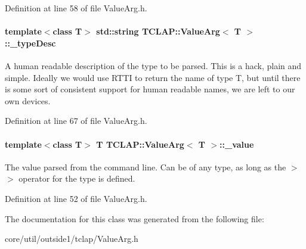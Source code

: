 Definition at line 58 of file Value\+Arg.\+h.

\paragraph[{\texorpdfstring{\+\_\+type\+Desc}{_typeDesc}}]{\setlength{\rightskip}{0pt plus 5cm}template$<$class T$>$ std\+::string {\bf T\+C\+L\+A\+P\+::\+Value\+Arg}$<$ T $>$\+::\+\_\+type\+Desc\hspace{0.3cm}{\ttfamily [protected]}}\hypertarget{classTCLAP_1_1ValueArg_a78c5e5b67ce4bcebb57c886d9aa49259}{}\label{classTCLAP_1_1ValueArg_a78c5e5b67ce4bcebb57c886d9aa49259}
A human readable description of the type to be parsed. This is a hack, plain and simple. Ideally we would use R\+T\+TI to return the name of type T, but until there is some sort of consistent support for human readable names, we are left to our own devices. 

Definition at line 67 of file Value\+Arg.\+h.

\paragraph[{\texorpdfstring{\+\_\+value}{_value}}]{\setlength{\rightskip}{0pt plus 5cm}template$<$class T$>$ T {\bf T\+C\+L\+A\+P\+::\+Value\+Arg}$<$ T $>$\+::\+\_\+value\hspace{0.3cm}{\ttfamily [protected]}}\hypertarget{classTCLAP_1_1ValueArg_a45d5fdfce5865c02e6663f7438d485c7}{}\label{classTCLAP_1_1ValueArg_a45d5fdfce5865c02e6663f7438d485c7}
The value parsed from the command line. Can be of any type, as long as the $>$$>$ operator for the type is defined. 

Definition at line 52 of file Value\+Arg.\+h.



The documentation for this class was generated from the following file\+:\begin{DoxyCompactItemize}
\item 
core/util/outside1/tclap/Value\+Arg.\+h\end{DoxyCompactItemize}
